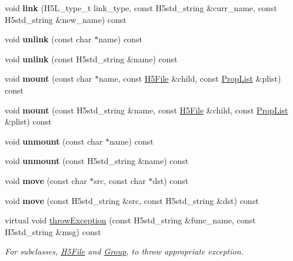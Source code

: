 \begin{DoxyCompactItemize}
void {\bfseries link} (H5\+L\+\_\+type\+\_\+t link\+\_\+type, const H5std\+\_\+string \&curr\+\_\+name, const H5std\+\_\+string \&new\+\_\+name) const
\item 
\mbox{\label{class_h5_1_1_h5_location_af1cfe7e54e5ab59b819240a78030c5bd}} 
void {\bfseries unlink} (const char $\ast$name) const
\item 
\mbox{\label{class_h5_1_1_h5_location_a32a71854f9ab8b460aa50057e5a119cf}} 
void {\bfseries unlink} (const H5std\+\_\+string \&name) const
\item 
\mbox{\label{class_h5_1_1_h5_location_ac36e6d1913457112281c01c24a0862a7}} 
void {\bfseries mount} (const char $\ast$name, const \hyperlink{class_h5_1_1_h5_file}{H5\+File} \&child, const \hyperlink{class_h5_1_1_prop_list}{Prop\+List} \&plist) const
\item 
\mbox{\label{class_h5_1_1_h5_location_aa03d003e87b9ee3a2ae1c7f5f5c64b06}} 
void {\bfseries mount} (const H5std\+\_\+string \&name, const \hyperlink{class_h5_1_1_h5_file}{H5\+File} \&child, const \hyperlink{class_h5_1_1_prop_list}{Prop\+List} \&plist) const
\item 
\mbox{\label{class_h5_1_1_h5_location_adf0ced1df2202e28f2b53adf8d0478c9}} 
void {\bfseries unmount} (const char $\ast$name) const
\item 
\mbox{\label{class_h5_1_1_h5_location_a1c84c3ded23fa97ea435c53c96f551fe}} 
void {\bfseries unmount} (const H5std\+\_\+string \&name) const
\item 
\mbox{\label{class_h5_1_1_h5_location_a17120f41e6a9f61ad85104597b0bfbb3}} 
void {\bfseries move} (const char $\ast$src, const char $\ast$dst) const
\item 
\mbox{\label{class_h5_1_1_h5_location_a4c98e9e65259cfef50f595ac0481283c}} 
void {\bfseries move} (const H5std\+\_\+string \&src, const H5std\+\_\+string \&dst) const
\item 
\mbox{\label{class_h5_1_1_h5_location_a8ceb2955cdcf2793ebaa3deafff6a051}} 
virtual void \hyperlink{class_h5_1_1_h5_location_a8ceb2955cdcf2793ebaa3deafff6a051}{throw\+Exception} (const H5std\+\_\+string \&func\+\_\+name, const H5std\+\_\+string \&msg) const
\begin{DoxyCompactList}\small\item\em For subclasses, \hyperlink{class_h5_1_1_h5_file}{H5\+File} and \hyperlink{class_h5_1_1_group}{Group}, to throw appropriate exception. \end{DoxyCompactList}\end{DoxyCompactItemize}
